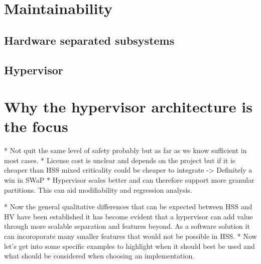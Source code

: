 
\section{Maintainability}
\subsection{Hardware separated subsystems}
\subsection{Hypervisor}


\section{Why the hypervisor architecture is the focus}

* Not quit the same level of safety probably but as far as we know sufficient in most cases. 
* License cost is unclear and depends on the project but if it is cheaper than HSS mixed criticality could be cheaper to integrate
-> Definitely a win in SWaP
* Hypervisor scales better and can therefore support more granular partitions. This can aid modifiability and regression analysis.

* Now the general qualitative differences that can be expected between HSS and HV have been established it has become evident that a hypervisor can add value through more scalable separation and features beyond. As a software solution it can incoroporate many smaller features that would not be possible in HSS.
* Now let's get into some specific examples to highlight when it should best be used and what should be considered when choosing an implementation.
